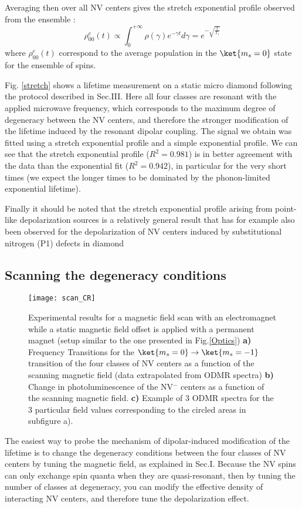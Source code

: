 \documentclass[preprintnumbers,amsmath,amssymb,onecolumn,12pt]{revtex4}
\begin{document}
Averaging then over all NV centers gives the stretch exponential profile observed from the ensemble :
$$ \rho_{00}^e(t) \propto \int_0^{+\infty} \rho(\gamma) e^{-\gamma t} d\gamma = e^{-\sqrt{\frac{t}{T_1}}} $$
where $ \rho_{00}^e(t)$ correspond to the average population in the $\ket{m_s=0}$ state for the ensemble of spins.

Fig. \ref{stretch} shows a lifetime measurement on a static micro diamond following the protocol described in Sec.III. Here all four classes are resonant with the applied microwave frequency, which corresponds to the maximum degree of degeneracy between the NV centers, and therefore the stronger modification of the lifetime induced by the resonant dipolar coupling. The signal we obtain was fitted using a stretch exponential profile  and a simple exponential profile. We can see that the stretch exponential profile ($R^2=0.981$) is in better agreement with the data than the exponential fit ($R^2=0.942$), in particular for the very short times (we expect the longer times to be dominated by the phonon-limited exponential lifetime).

Finally it should be noted that the stretch exponential profile arising from point-like depolarization sources is a relatively general result that has for example also been observed for the depolarization of NV centers induced by substitutional nitrogen (P1) defects in diamond \cite{hall_detection_2016}

\subsection{Scanning the degeneracy conditions}
\begin{figure}
\texttt{[image: scan\_CR]}
\caption{Experimental results for a magnetic field scan with an electromagnet while a static magnetic field offset is applied with a permanent magnet (setup similar to the one presented in Fig.\ref{Optics}) \textbf{a)} Frequency Transitions for the $\ket{m_s=0} \to \ket{m_s=-1}$ transition of the four classes of NV centers as a function of the scanning magnetic field (data extrapolated from ODMR spectra) \textbf{b)} Change in photoluminescence of the NV$^-$ centers as a function of the scanning magnetic field. \textbf{c)} Example of 3 ODMR spectra for the 3 particular field values corresponding to the circled areas in subfigure a).}
	\label{scan_dege}
\end{figure}
The easiest way to probe the mechanism of dipolar-induced modification of the lifetime is to change the degeneracy conditions between the four classes of NV centers by tuning the magnetic field, as explained in Sec.I.
Because the NV spins can only exchange spin quanta when they are quasi-resonant, then by tuning the number of classes at degeneracy, you can modify the effective density of interacting NV centers, and therefore tune the depolarization effect. 
\end{document}
